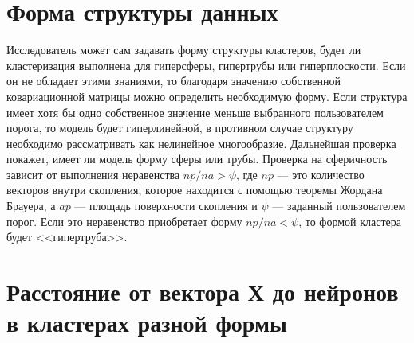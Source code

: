 \documentclass[unicode, 12pt, a4paper,oneside,fleqn]{article}
\begin{document}
\section{Форма структуры данных}

Исследователь может сам задавать форму структуры кластеров, будет ли
кластеризация выполнена для гиперсферы, гипертрубы или
гиперплоскости. Если он не обладает этими знаниями, то благодаря
значению собственной ковариационной матрицы можно определить
необходимую форму. Если структура имеет хотя бы одно собственное
значение меньше выбранного пользователем порога, то модель будет
гиперлинейной, в противном случае структуру необходимо рассматривать
как нелинейное многообразие. Дальнейшая проверка покажет, имеет ли
модель форму сферы или трубы. Проверка на сферичность зависит от
выполнения неравенства $np/na > \psi$, где $np$ — это количество
векторов внутри скопления, которое находится с помощью теоремы Жордана
Брауера, а $ap$ — площадь поверхности скопления и $\psi$ — заданный
пользователем порог. Если это неравенство приобретает форму
$np/na < \psi$, то формой кластера будет <<гипертруба>>.

\section{Расстояние от вектора Х до нейронов в кластерах разной формы}
\end{document}
